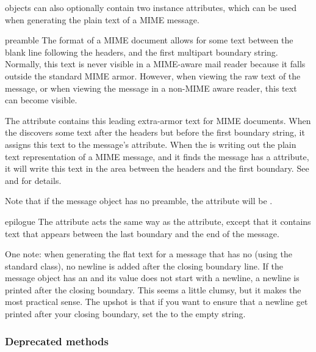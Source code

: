  objects can also optionally contain two instance
attributes, which can be used when generating the plain text of a MIME
message.

\begin{datadesc}{preamble}
The format of a MIME document allows for some text between the blank
line following the headers, and the first multipart boundary string.
Normally, this text is never visible in a MIME-aware mail reader
because it falls outside the standard MIME armor.  However, when
viewing the raw text of the message, or when viewing the message in a
non-MIME aware reader, this text can become visible.

The  attribute contains this leading extra-armor text
for MIME documents.  When the  discovers some text after
the headers but before the first boundary string, it assigns this text
to the message's  attribute.  When the 
is writing out the plain text representation of a MIME message, and it
finds the message has a  attribute, it will write this
text in the area between the headers and the first boundary.  See
 and  for details.

Note that if the message object has no preamble, the
 attribute will be .
\end{datadesc}

\begin{datadesc}{epilogue}
The  attribute acts the same way as the 
attribute, except that it contains text that appears between the last
boundary and the end of the message.

One note: when generating the flat text for a 
message that has no  (using the standard
 class), no newline is added after the closing
boundary line.  If the message object has an  and its
value does not start with a newline, a newline is printed after the
closing boundary.  This seems a little clumsy, but it makes the most
practical sense.  The upshot is that if you want to ensure that a
newline get printed after your closing  boundary,
set the  to the empty string.
\end{datadesc}

\subsubsection{Deprecated methods}

